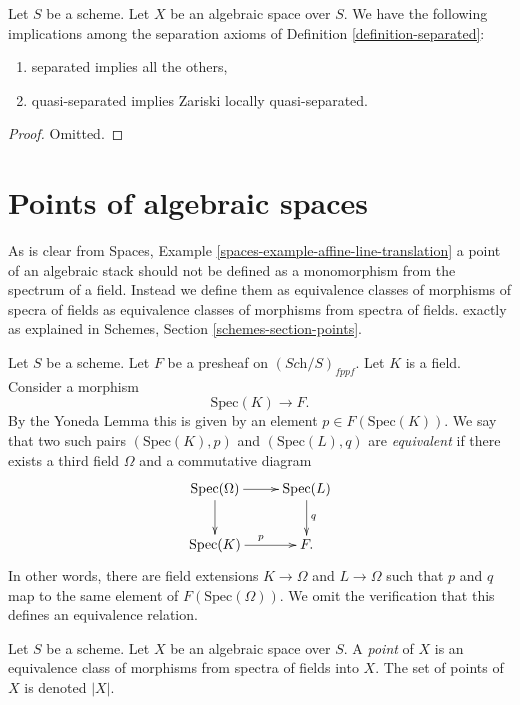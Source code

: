 \begin{lemma}
\label{lemma-trivial-implications}
Let $S$ be a scheme.
Let $X$ be an algebraic space over $S$.
We have the following implications among the separation axioms
of Definition \ref{definition-separated}:
\begin{enumerate}
\item separated implies all the others,
\item quasi-separated implies Zariski locally quasi-separated.
\end{enumerate}
\end{lemma}

\begin{proof}
Omitted.
\end{proof}











\section{Points of algebraic spaces}
\label{section-points}

\noindent
As is clear from Spaces, Example \ref{spaces-example-affine-line-translation}
a point of an algebraic stack should not be defined as a monomorphism
from the spectrum of a field.
Instead we define them as equivalence classes of morphisms of specra
of fields as equivalence classes of morphisms from spectra of fields.
exactly as explained in Schemes, Section \ref{schemes-section-points}.

\medskip\noindent
Let $S$ be a scheme.
Let $F$ be a presheaf on $(\textit{Sch}/S)_{fppf}$.
Let $K$ is a field. Consider a morphism
$$
\text{Spec}(K) \longrightarrow F.
$$
By the Yoneda Lemma this is given by an
element $p \in F(\text{Spec}(K))$. We say that two such
pairs $(\text{Spec}(K), p)$ and $(\text{Spec}(L), q)$
are {\it equivalent} if there exists
a third field $\Omega$ and a commutative diagram
$$
\xymatrix{
\text{Spec}(\Omega) \ar[r] \ar[d] &
\text{Spec}(L) \ar[d]^q \\
\text{Spec}(K) \ar[r]^p &
F.
}
$$
In other words, there are field extensions
$K \to \Omega$ and $L \to \Omega$ such that
$p$ and $q$ map to the same element
of $F(\text{Spec}(\Omega))$. We omit the verification that this
defines an equivalence relation.

\begin{definition}
\label{definition-points}
Let $S$ be a scheme. Let $X$ be an algebraic space over $S$.
A {\it point} of $X$ is an equivalence class of morphisms
from spectra of fields into $X$.
The set of points of $X$ is denoted $|X|$.
\end{definition}

